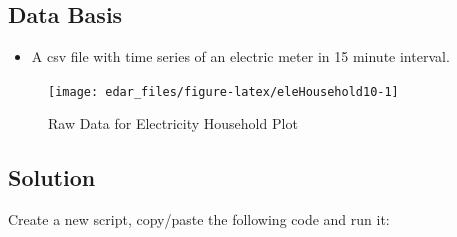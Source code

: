 \documentclass[
  a4paperpaper,
]{book}
\providecommand{\tightlist}{%
  \setlength{\itemsep}{0pt}\setlength{\parskip}{0pt}}
\begin{document}
\hypertarget{data-basis-21}{%
\subsection{Data Basis}\label{data-basis-21}}

\begin{itemize}
\tightlist
\item
  A csv file with time series of an electric meter in 15 minute interval.
\end{itemize}

\begin{figure}
\texttt{[image: edar\_files/figure-latex/eleHousehold10-1]} \caption{Raw Data for Electricity Household Plot}\label{fig:eleHousehold10}
\end{figure}

\newpage

\hypertarget{solution-21}{%
\subsection{Solution}\label{solution-21}}

Create a new script, copy/paste the following code and run it:
\end{document}
